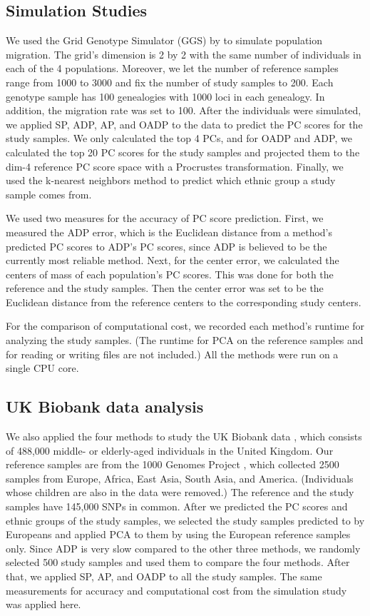 \documentclass{article}
\begin{document}
\subsection{Simulation Studies}

We used the Grid Genotype Simulator (GGS)
by \citet{mathieson2012differential}
to simulate population migration.
The grid's dimension is 2 by 2
with the same number of individuals
in each of the 4 populations.
Moreover, we let the number of reference samples
range from 1000 to 3000
and fix the number of study samples to 200.
Each genotype sample has 100 genealogies
with 1000 loci in each genealogy.
In addition, the migration rate was set to 100.
After the individuals were simulated,
we applied SP, ADP, AP, and OADP to the data
to predict the PC scores for the study samples.
We only calculated the top 4 PCs,
and for OADP and ADP,
we calculated the top 20 PC scores for the study samples
and projected them to the dim-4 reference PC score space
with a Procrustes transformation.
Finally, we used the k-nearest neighbors method
to predict which ethnic group a study sample comes from.

We used two measures for the accuracy of PC score prediction.
First, we measured the ADP error,
which is the Euclidean distance
from a method's predicted PC scores
to ADP's PC scores,
since ADP is believed to be the currently most reliable method.
Next, for the center error,
we calculated the centers of mass of each population's PC scores.
This was done for both the reference and the study samples.
Then the center error
was set to be the Euclidean distance
from the reference centers to the corresponding study centers.

For the comparison of computational cost,
we recorded each method's runtime for analyzing the study samples.
(The runtime for PCA on the reference samples
and for reading or writing files are not included.)
All the methods were run on a single CPU core.

\subsection{UK Biobank data analysis}

We also applied the four methods
to study the UK Biobank data \citep{sudlow2015uk},
which consists of 488,000 middle- or elderly-aged individuals
in the United Kingdom.
Our reference samples
are from the 1000 Genomes Project \citep{10002015global},
which collected 2500 samples from Europe, Africa, East Asia, South Asia, and America.
(Individuals whose children are also in the data were removed.)
The reference and the study samples
have 145,000 SNPs in common.
After we predicted the PC scores and ethnic groups
of the study samples,
we selected the study samples predicted to by Europeans
and applied PCA to them
by using the European reference samples only.
Since ADP is very slow compared to the other three methods,
we randomly selected 500 study samples
and used them to compare the four methods.
After that,
we applied SP, AP, and OADP to all the study samples.
The same measurements for accuracy and computational cost
from the simulation study
was applied here.
\end{document}

